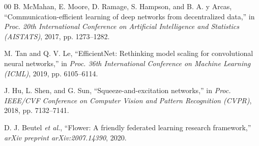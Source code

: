 \documentclass[conference]{IEEEtran}
\begin{document}
\begin{thebibliography}{00}
B. McMahan, E. Moore, D. Ramage, S. Hampson, and B. A. y Arcas, ``Communication-efficient learning of deep networks from decentralized data,'' in \emph{Proc. 20th International Conference on Artificial Intelligence and Statistics (AISTATS)}, 2017, pp. 1273--1282.

M. Tan and Q. V. Le, ``EfficientNet: Rethinking model scaling for convolutional neural networks,'' in \emph{Proc. 36th International Conference on Machine Learning (ICML)}, 2019, pp. 6105--6114.

J. Hu, L. Shen, and G. Sun, ``Squeeze-and-excitation networks,'' in \emph{Proc. IEEE/CVF Conference on Computer Vision and Pattern Recognition (CVPR)}, 2018, pp. 7132--7141.

D. J. Beutel \emph{et al.}, ``Flower: A friendly federated learning research framework,'' \emph{arXiv preprint arXiv:2007.14390}, 2020.
\end{thebibliography}
\end{document}
